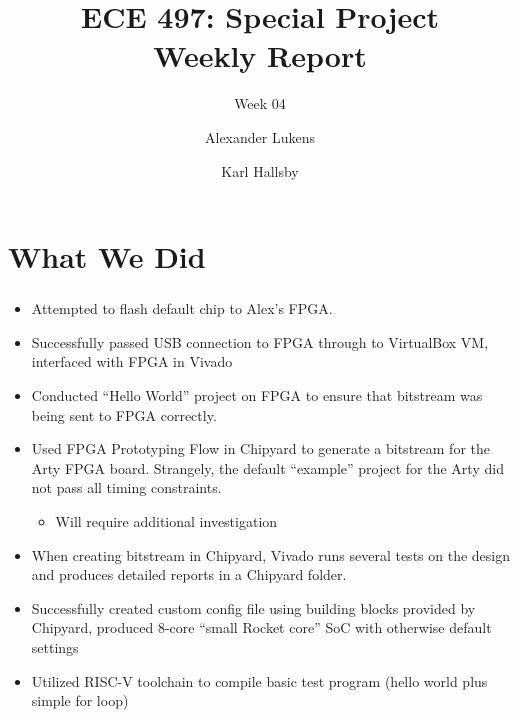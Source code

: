 \documentclass{../weeklyslides}
\title[Weekly Report]{ECE 497: Special Project \\ Weekly Report}
\subtitle{Week 04}
\author{Alexander Lukens \and Karl Hallsby}
\institute{Illinois Institute of Technology}
\date{\DTMdisplaydate{2021}{2}{18}{-1}}
\begin{document}
\nocite{chipyard}

\begin{frame}
  \titlepage{}
\end{frame}

\section{What We Did}\label{sec:What_We_Did}
\begin{frame}
  \frametitle{}
  \begin{itemize}
  \item Attempted to flash default chip to Alex's FPGA.\@
  \item Successfully passed USB connection to FPGA through to VirtualBox VM, interfaced with FPGA in Vivado
  \item Conducted ``Hello World'' project on FPGA to ensure that bitstream was being sent to FPGA correctly.
  \item Used FPGA Prototyping Flow in Chipyard to generate a bitstream for the Arty FPGA board.
    Strangely, the default ``example'' project for the Arty did not pass all timing constraints.
    \begin{itemize}
    \item Will require additional investigation
    \end{itemize}
  \item When creating bitstream in Chipyard, Vivado runs several tests on the design and produces detailed reports in a Chipyard folder.
  \end{itemize}
\end{frame}

\begin{frame}
  \begin{itemize}
  \item Successfully created custom config file using building blocks provided by Chipyard, produced 8-core ``small Rocket core'' SoC with otherwise default settings
  \item Utilized RISC-V toolchain to compile basic test program (hello world plus simple for loop)
  \end{itemize}
\end{frame}
\end{document}
